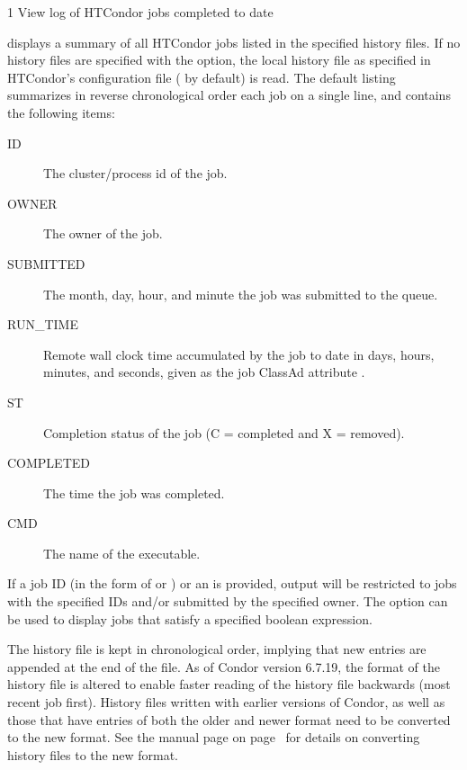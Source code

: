 \begin{ManPage}{\label{man-condor-history}}{1}
{View log of HTCondor jobs completed to date}
\Synopsis
{}


\Description
{} displays a summary of all HTCondor jobs listed in the
specified history files.
If no history files are specified with the  option, 
the local history file as specified in HTCondor's configuration file
( by default) is read.  
The default listing summarizes in reverse chronological order
each job on a single line, and  contains the following items:


\begin{description}
\item[ID] The cluster/process id of the job. 
\item[OWNER] The owner of the job. 
\item[SUBMITTED] The month, day, hour, and minute the job was submitted to the queue. 
\item[RUN\_TIME] Remote wall clock time accumulated by the job to date in days, hours, minutes, and seconds,  given as the job ClassAd attribute
.
\item[ST] Completion status of the job (C = completed and X = removed).
\item[COMPLETED] The time the job was completed.
\item[CMD] The name of the executable. 
\end{description}

If a job ID (in the form of  or ) or an
 is provided, output will be restricted to jobs with the
specified IDs and/or submitted by the specified owner.  
The  option can be used to display jobs that satisfy a
specified boolean expression.

The history file is kept in chronological order,
implying that new entries are appended at the end of the
file.
As of Condor version 6.7.19,
the format of the history file is altered to enable faster
reading of the history file backwards (most recent job first).
History files written with earlier versions of Condor,
as well as those that have entries of both
the older and newer format
need to be converted to the new format.
See the  manual page 
on page~\pageref{man-condor-convert-history}
for details on converting history files to the new format.


\end{ManPage}
